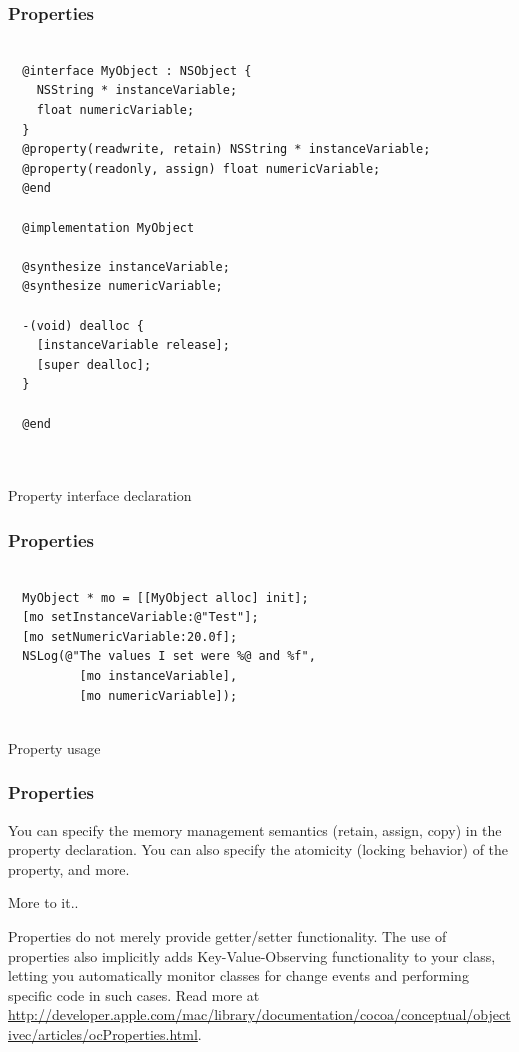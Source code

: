 \documentclass[10pt]{beamer}
\begin{document}
\begin{frame}[fragile]
  \frametitle{Properties}
  \begin{listing}[H]
    \begin{verbatim}
  
  @interface MyObject : NSObject {
    NSString * instanceVariable;
    float numericVariable;
  }
  @property(readwrite, retain) NSString * instanceVariable;
  @property(readonly, assign) float numericVariable;
  @end
  
  @implementation MyObject
  
  @synthesize instanceVariable;
  @synthesize numericVariable;
  
  -(void) dealloc {
    [instanceVariable release];
    [super dealloc];
  }
  
  @end
  
              
  \end{verbatim}
    \caption{Property interface declaration}
    \label{listing:11}
  \end{listing}

\end{frame}

\begin{frame}[fragile]
  \frametitle{Properties}
  \begin{listing}[H]
    \begin{verbatim}
  
  MyObject * mo = [[MyObject alloc] init];
  [mo setInstanceVariable:@"Test"];
  [mo setNumericVariable:20.0f];
  NSLog(@"The values I set were %@ and %f",
          [mo instanceVariable],
          [mo numericVariable]);
              
  \end{verbatim}
    \caption{Property usage}
    \label{listing:12}
  \end{listing}

\end{frame}

\begin{frame}[fragile]
  \frametitle{Properties}
  You can specify the memory management semantics (retain, assign, copy) in the property declaration.  You can also specify the atomicity (locking behavior) of the property, and more.
\begin{block}{More to it..}
  
  Properties do not merely provide getter/setter functionality.  The use of properties
  also implicitly adds Key-Value-Observing functionality to your class, letting
  you automatically monitor classes for change events and performing specific code
  in such cases.  Read more at \url{http://developer.apple.com/mac/library/documentation/cocoa/conceptual/objectivec/articles/ocProperties.html}.
              
  \end{block}

\end{frame}
\end{document}
